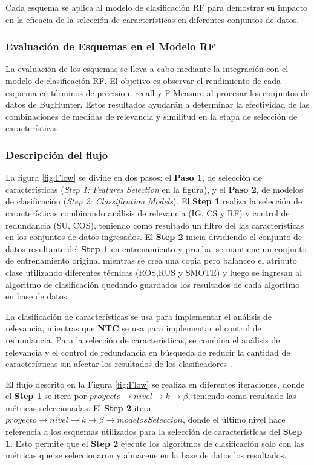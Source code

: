Cada esquema se aplica al modelo de clasificación RF para demostrar su impacto en la eficacia de la selección de características en diferentes conjuntos de datos.

\subsubsection{Evaluación de Esquemas en el Modelo RF}

La evaluación de los esquemas se lleva a cabo mediante la integración con el modelo de clasificación RF. El objetivo es observar el rendimiento de cada esquema en términos de precision, recall y F-Measure al procesar los conjuntos de datos de BugHunter. Estos resultados ayudarán a determinar la efectividad de las combinaciones de medidas de relevancia y similitud en la etapa de selección de características.

\subsubsection{Descripción del flujo}
La figura \ref{fig:Flow} se divide en dos pasos: el \textbf{Paso 1}, de selección de características (\textit{Step 1: Features Selection} en la figura), y el \textbf{Paso 2}, de modelos de clasificación (\textit{Step 2: Classification Models}). El \textbf{Step 1} realiza la selección de características combinando análisis de relevancia (IG, CS y RF) y control de redundancia (SU, COS), teniendo como resultado un filtro del las características en los conjuntos de datos ingresados. El \textbf{Step 2} inicia dividiendo el conjunto de datos resultante del \textbf{Step 1} en entrenamiento y prueba, se mantiene un conjunto de entrenamiento original mientras se crea una copia pero balanceo el atributo clase utilizando diferentes técnicas (ROS,RUS y SMOTE) y luego se ingresan al algoritmo de clasificación quedando guardados los resultados de cada algoritmo en base de datos. 

La clasificación de características se usa para implementar el análisis de relevancia, mientras que \textbf{NTC} se usa para implementar el control de redundancia. Para la selección de características, se combina el análisis de relevancia y el control de redundancia en búsqueda de reducir la cantidad de características sin afectar los resultados de los clasificadores  \cite{liu_empirical_2015}.

El flujo descrito en la Figura \ref{fig:Flow} se realiza en diferentes iteraciones, donde el \textbf{Step 1} se itera por \(proyecto \rightarrow nivel \rightarrow k \rightarrow \beta\), teniendo como resultado las métricas seleccionadas. El \textbf{Step 2} itera \(proyecto \rightarrow nivel \rightarrow k \rightarrow \beta \rightarrow modelosSeleccion \), donde el último nivel hace referencia a los esquemas utilizados para la selección de características del \textbf{Step 1}. Esto permite que el \textbf{Step 2} ejecute los algoritmos de clasificación solo con las métricas que se seleccionaron y almacene en la base de datos los resultados.

